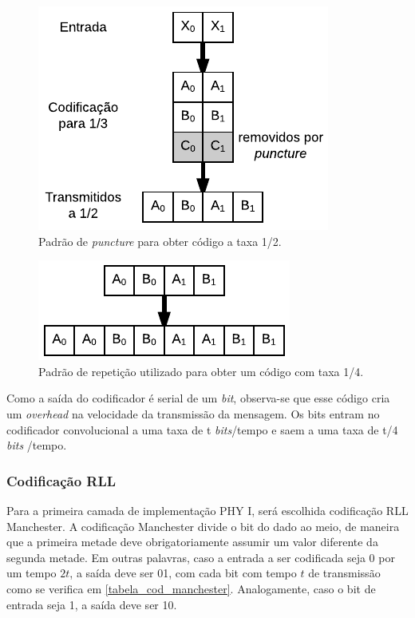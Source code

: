 	\begin{figure}[htb]
		\caption{\label{schematics_convolutional_puncture} Padrão de \textit{puncture} para obter código a taxa 1/2.}
		\centering
		\includegraphics[width=0.3\textheight]{schematics/convolutional_puncture.pdf}
	\end{figure}
	\begin{figure}[htb]
		\caption{\label{schematics_convolutional_repetition} Padrão de repetição utilizado para obter um código com taxa 1/4.}
		\centering
		\includegraphics[width=0.3\textheight]{schematics/convolutional_repetition.pdf}
	\end{figure}
	
	Como a saída do codificador é serial de um \textit{bit}, observa-se que esse código cria um \textit{overhead} na velocidade da transmissão da mensagem. Os bits entram no codificador convolucional a uma taxa de t \textit{bits}/tempo e saem a uma taxa de t/4 \textit{bits} /tempo.
	
	\subsubsection{Codificação RLL}
	
	Para a primeira camada de implementação PHY I, será escolhida codificação RLL Manchester. A codificação Manchester divide o bit do dado ao meio, de maneira que a primeira metade deve obrigatoriamente assumir um valor diferente da segunda metade. Em outras palavras, caso a entrada a ser codificada seja 0 por um tempo $2t$, a saída deve ser 01, com cada bit com tempo $t$ de transmissão como se verifica em \autoref{tabela_cod_manchester}. Analogamente, caso o bit de entrada seja 1, a saída deve ser 10.
	
